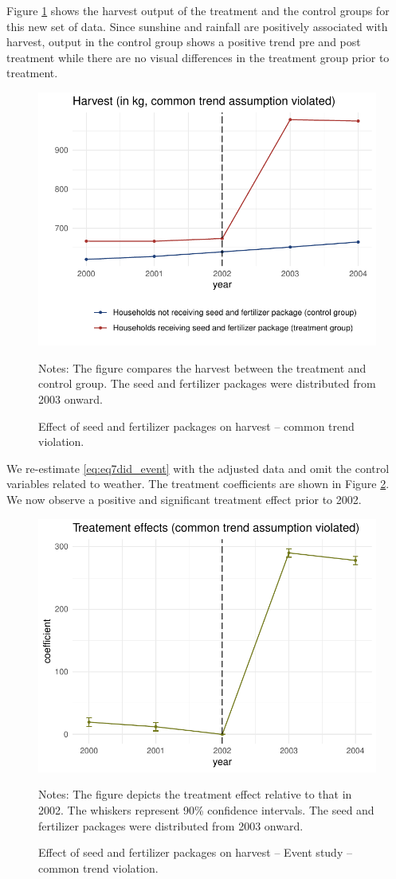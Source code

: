 Figure \ref{fig:did_d} shows the harvest output of the treatment and the control groups for this new set of data. 
Since sunshine and rainfall are positively associated with harvest, output in the control group shows a positive trend pre and post treatment while there are no visual differences in the treatment group prior to treatment.

\begin{figure}[htb]
	\begin{center}
		\includegraphics[width=0.55\linewidth]{../figures/part5d.pdf}
	\end{center}
	\caption{Effect of seed and fertilizer packages on harvest -- common trend violation.}
	\label{fig:did_d}	{\footnotesize Notes: The figure compares the harvest between the treatment and control group. The seed and fertilizer packages were distributed from 2003 onward.}
\end{figure}

We re-estimate \eqref{eq:eq7did_event} with the adjusted data and omit the control variables related to weather. The treatment coefficients are shown in Figure \ref{fig:did_d2}. We now observe a positive and significant treatment effect prior to 2002.


\begin{figure}[htb]
	\begin{center}
		\includegraphics[width=0.55\linewidth]{../figures/part5d2.pdf}
	\end{center}
	\caption{Effect of seed and fertilizer packages on harvest -- Event study -- common trend violation.}
	\label{fig:did_d2}	{\footnotesize Notes: The figure depicts the treatment effect relative to that in 2002. The whiskers represent 90\% confidence intervals. The seed and fertilizer packages were distributed from 2003 onward.}
\end{figure}



\clearpage





\clearpage


